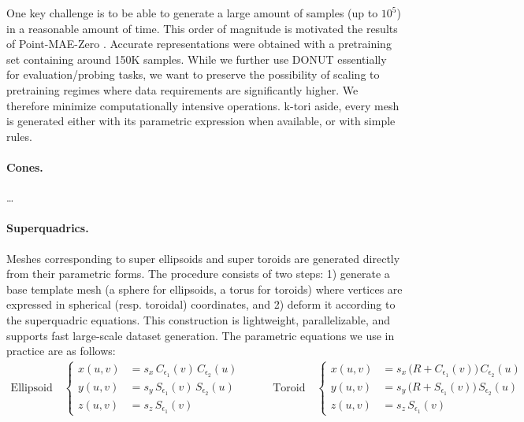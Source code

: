 One key challenge is to be able to generate a large amount of samples (up to $10^5$) in a reasonable amount of time. This order of magnitude is motivated the results of Point-MAE-Zero \cite{pmaezero}. Accurate representations were obtained with a pretraining set containing around 150K samples. While we further use DONUT essentially for evaluation/probing tasks, we want to preserve the possibility of scaling to pretraining regimes where data requirements are significantly higher. We therefore minimize computationally intensive operations. k-tori aside, every mesh is generated either with its parametric expression when available, or with simple rules.

\paragraph{Cones.} \dots

\paragraph{Superquadrics.} Meshes corresponding to super ellipsoids and super toroids are generated directly from their parametric forms. The procedure consists of two steps: 1) generate a base template mesh (a sphere for ellipsoids, a torus for toroids) where vertices are expressed in spherical (resp. toroidal) coordinates, and 2) deform it according to the superquadric equations. This construction is lightweight, parallelizable, and supports fast large-scale dataset generation. The parametric equations we use in practice are as follows:
\begin{equation}
\begin{aligned}
\text{Ellipsoid} \quad
\begin{cases}
x(u,v) &= s_x \, C_{\epsilon_1}(v) \, C_{\epsilon_2}(u) \\
y(u,v) &= s_y \, S_{\epsilon_1}(v) \, S_{\epsilon_2}(u) \\
z(u,v) &= s_z \, S_{\epsilon_1}(v)
\end{cases}
\end{aligned}
\qquad
\begin{aligned}
\text{Toroid} \quad
\begin{cases}
x(u,v) &= s_x \, \bigl(R + C_{\epsilon_1}(v)\bigr) \, C_{\epsilon_2}(u) \\
y(u,v) &= s_y \, \bigl(R + S_{\epsilon_1}(v)\bigr) \, S_{\epsilon_2}(u) \\
z(u,v) &= s_z \, S_{\epsilon_1}(v)
\end{cases}
\end{aligned}
\end{equation}


